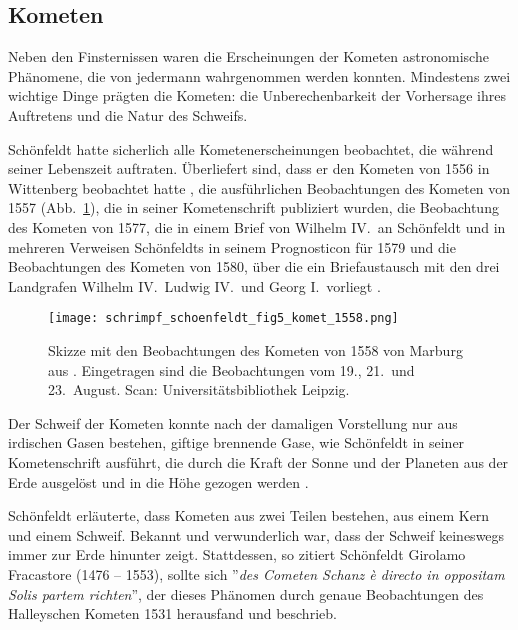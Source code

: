 \documentclass[12pt]{article}
\begin{document}
\subsection{Kometen}

Neben den Finsternissen waren die Erscheinungen der Kometen astronomische Phänomene, die von jedermann wahrgenommen werden konnten. Mindestens zwei wichtige Dinge prägten die Kometen: die Unberechenbarkeit der Vorhersage ihres Auftretens und die Natur des Schweifs.

Schönfeldt hatte sicherlich alle Kometenerscheinungen beobachtet, die während seiner Lebenszeit auftraten. Überliefert sind, dass er den Kometen von 1556 in Wittenberg beobachtet hatte \cite{Bechstein1875}, die ausführlichen Beobachtungen des Kometen von 1557 (Abb.\ \ref{fig_komet_1558}), die in seiner Kometenschrift \cite{Schoenfeldt1558} publiziert wurden, die Beobachtung des Kometen von 1577, die in einem Brief von Wilhelm IV.\ an Schönfeldt \cite{Wilhelm1586} und in mehreren Verweisen Schönfeldts in seinem Prognosticon für 1579 \cite{Schoenfeldt1579} und die Beobachtungen des Kometen von 1580, über die ein Briefaustausch mit den drei Landgrafen Wilhelm IV.\, Ludwig IV.\ und Georg I.\ vorliegt \cite{Wilhelm1580}. 

\begin{figure}[H]
	\begin{center}
		\texttt{[image: schrimpf\_schoenfeldt\_fig5\_komet\_1558.png]}
		\caption{Skizze mit den Beobachtungen des Kometen von 1558 von Marburg aus \cite{Schoenfeldt1560}. Eingetragen sind die Beobachtungen vom 19., 21.\ und 23.\ August. Scan:  Universitätsbibliothek Leipzig.}
		\label{fig_komet_1558}
	\end{center}
\end{figure}

Der Schweif der Kometen konnte nach der damaligen Vorstellung nur aus irdischen Gasen bestehen, giftige brennende Gase, wie Schönfeldt in seiner Kometenschrift ausführt, die durch die Kraft der Sonne und der Planeten aus der Erde ausgelöst und in die Höhe gezogen werden \cite{Schoenfeldt1558}. 

Schönfeldt erläuterte, dass Kometen aus zwei Teilen bestehen, aus einem Kern und einem Schweif. Bekannt und verwunderlich war, dass der Schweif keineswegs immer zur Erde hinunter zeigt. Stattdessen, so zitiert Schönfeldt Girolamo Fracastore (1476 -- 1553), sollte sich ''\emph{des Cometen Schanz \`{e} directo in oppositam Solis partem richten}'', der dieses Phänomen durch genaue Beobachtungen des Halleyschen Kometen 1531 herausfand und beschrieb.
\end{document}
